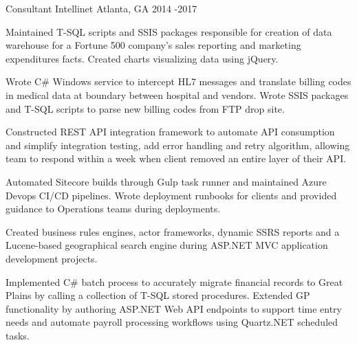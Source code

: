 \begin{cventries}
  \cventry
    {Consultant} %
    {Intellinet} %
    {Atlanta, GA} %
    {2014 -2017 } %
    {
      \begin{cvitems} %
        \item {Maintained T-SQL scripts and SSIS packages responsible for creation of data warehouse for a Fortune 500 company's sales reporting and marketing expenditures facts. Created charts visualizing data using jQuery.}
	\item {Wrote C\# Windows service to intercept HL7 messages and translate billing codes in medical data at boundary between hospital and vendors. Wrote SSIS packages and T-SQL scripts to parse new billing codes from FTP drop site.}
        \item {Constructed REST API integration framework to automate API consumption and simplify integration testing, add error handling and retry algorithm, allowing team to respond within a week when client removed an entire layer of their API.}
	\item {Automated Sitecore builds through Gulp task runner and maintained Azure Devops CI/CD pipelines. Wrote deployment runbooks for clients and provided guidance to Operations teams during deployments.}
	\item {Created business rules engines, actor frameworks, dynamic SSRS reports and a Lucene-based geographical search engine during ASP.NET MVC application development projects.}
	\item {Implemented C\# batch process to accurately migrate financial records to Great Plains by calling a collection of T-SQL stored procedures. Extended GP functionality by authoring ASP.NET Web API endpoints to support time entry needs and automate payroll processing workflows using Quartz.NET scheduled tasks.}
      \end{cvitems}
    }


\end{cventries}
